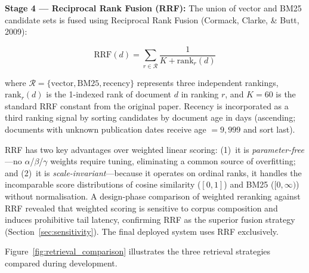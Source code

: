\textbf{Stage 4 --- Reciprocal Rank Fusion (RRF):} The union of vector and BM25 candidate sets is fused using Reciprocal Rank Fusion (Cormack, Clarke, \& Butt, 2009):

\begin{equation}
  \text{RRF}(d) = \sum_{r \in \mathcal{R}} \frac{1}{K + \text{rank}_r(d)}
  \label{eq:rrf}
\end{equation}

\noindent where $\mathcal{R} = \{\text{vector}, \text{BM25}, \text{recency}\}$ represents three independent rankings, $\text{rank}_r(d)$ is the 1-indexed rank of document $d$ in ranking $r$, and $K = 60$ is the standard RRF constant from the original paper. Recency is incorporated as a third ranking signal by sorting candidates by document age in days (ascending; documents with unknown publication dates receive age $= 9{,}999$ and sort last).

RRF has two key advantages over weighted linear scoring: (1)~it is \emph{parameter-free}---no $\alpha$/$\beta$/$\gamma$ weights require tuning, eliminating a common source of overfitting; and (2)~it is \emph{scale-invariant}---because it operates on ordinal ranks, it handles the incomparable score distributions of cosine similarity ($[0,1]$) and BM25 ($[0, \infty)$) without normalisation. A design-phase comparison of weighted reranking against RRF revealed that weighted scoring is sensitive to corpus composition and induces prohibitive tail latency, confirming RRF as the superior fusion strategy (Section~\ref{sec:sensitivity}). The final deployed system uses RRF exclusively.

Figure~\ref{fig:retrieval_comparison} illustrates the three retrieval strategies compared during development.

